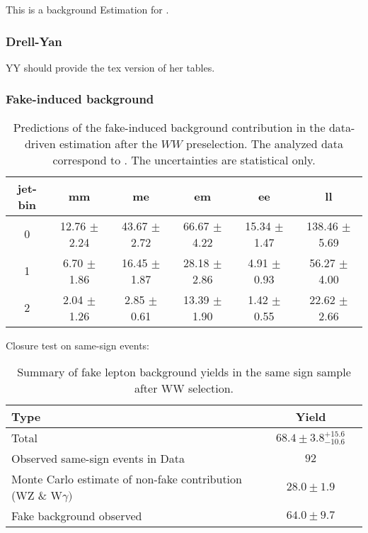 This is a background Estimation for \lpintlumi.

\subsubsection{Drell-Yan}

YY should provide the tex version of her tables.

\subsubsection{Fake-induced background}

\begin{table}[!htbp]
\begin{center}
\begin{tabular}{c c c c c c} 
\hline
jet-bin &	 mm &	 me &	 em &	 ee &	 ll \\ 
\hline
0 &	 12.76 $\pm$ 2.24 &	 43.67 $\pm$ 2.72 &	 66.67 $\pm$ 4.22 &	 15.34 $\pm$ 1.47 &	 138.46 $\pm$ 5.69 \\
1 &	 6.70 $\pm$ 1.86  &      16.45 $\pm$ 1.87 &      28.18 $\pm$ 2.86 &       4.91 $\pm$ 0.93 &       56.27 $\pm$ 4.00 \\
2 &	 2.04 $\pm$ 1.26  &       2.85 $\pm$ 0.61 &      13.39 $\pm$ 1.90 &       1.42 $\pm$ 0.55 &       22.62 $\pm$ 2.66 \\
\hline
\end{tabular}
\caption{Predictions of the fake-induced background contribution 
in the data-driven estimation after the $WW$ preselection. 
The analyzed data correspond to \lpintlumi.
The uncertainties are statistical only.}
\label{tab:lp_fake_est}
\end{center}
\end{table}

Closure test on same-sign events:
\begin{table}[!htbp]
\begin{center}
\begin{tabular}{|l|c|c|}
\hline
Type           & Yield \\
\hline
Total                   &  $68.4\pm3.8^{+15.6}_{-10.6}$  \\
\hline
Observed same-sign events in Data        &  $92$   \\
Monte Carlo estimate of non-fake contribution (WZ \& W$\gamma)$         &  $28.0\pm1.9$\\
Fake background observed  &  $64.0\pm9.7$  \\

\hline
\end{tabular}
\caption{Summary of fake lepton background yields in the same sign sample after WW selection. }
\label{tab:lp_FakeLeptonBkgPrediction_SameSignSample}
\end{center}
\end{table}


